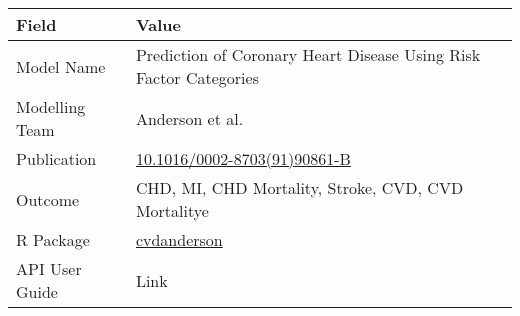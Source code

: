 \documentclass[
]{book}
\begin{document}
\begin{longtable}[]{@{}ll@{}}
\toprule
\begin{minipage}[b]{0.45\columnwidth}\raggedright
Field\strut
\end{minipage} & \begin{minipage}[b]{0.49\columnwidth}\raggedright
Value\strut
\end{minipage}\tabularnewline
\midrule
\endhead
\begin{minipage}[t]{0.45\columnwidth}\raggedright
Model Name\strut
\end{minipage} & \begin{minipage}[t]{0.49\columnwidth}\raggedright
Prediction of Coronary Heart Disease Using Risk Factor Categories\strut
\end{minipage}\tabularnewline
\begin{minipage}[t]{0.45\columnwidth}\raggedright
Modelling Team\strut
\end{minipage} & \begin{minipage}[t]{0.49\columnwidth}\raggedright
Anderson et al.\strut
\end{minipage}\tabularnewline
\begin{minipage}[t]{0.45\columnwidth}\raggedright
Publication\strut
\end{minipage} & \begin{minipage}[t]{0.49\columnwidth}\raggedright
\href{https://doi.org/10.1016/0002-8703(91)90861-B}{10.1016/0002-8703(91)90861-B}\strut
\end{minipage}\tabularnewline
\begin{minipage}[t]{0.45\columnwidth}\raggedright
Outcome\strut
\end{minipage} & \begin{minipage}[t]{0.49\columnwidth}\raggedright
CHD, MI, CHD Mortality, Stroke, CVD, CVD Mortalitye\strut
\end{minipage}\tabularnewline
\begin{minipage}[t]{0.45\columnwidth}\raggedright
R Package\strut
\end{minipage} & \begin{minipage}[t]{0.49\columnwidth}\raggedright
\href{https://github.com/resplab/cvdanderson}{cvdanderson}\strut
\end{minipage}\tabularnewline
\begin{minipage}[t]{0.45\columnwidth}\raggedright
API User Guide\strut
\end{minipage} & \begin{minipage}[t]{0.49\columnwidth}\raggedright
Link\strut
\end{minipage}\tabularnewline
\bottomrule
\end{longtable}
\end{document}
